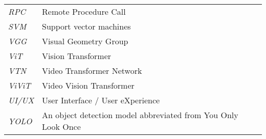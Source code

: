 \begin{changemargin}{-0.5cm}{0cm}
\begin{multicols*}{2}
\begin{supertabular}{>{\em}lp{6.2cm}}
RPC & Remote Procedure Call \\ [.5em]
SVM & Support vector machines \\ [.5em]
VGG & Visual Geometry Group \\ [.5em]
ViT & Vision Transformer \\ [.5em]
VTN & Video Transformer Network \\ [.5em]
ViViT & Video Vision Transformer \\ [.5em]
UI/UX & User Interface / User eXperience \\ [.5em]
YOLO & An object detection model abbreviated from You Only Look Once \\ [.5em]
\end{supertabular}
\end{multicols*}
\end{changemargin}